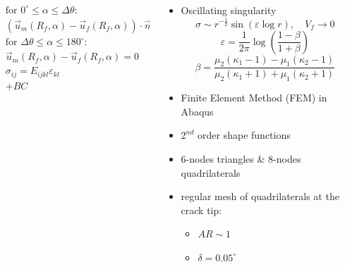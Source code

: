 \documentclass[first,firstsupp,lastsupp,last,hyperref,table]{ETHclass}
\begin{document}
\begin{frame}
\begin{columns}
\begin{column}{0.6\textwidth}
\begin{columns}
\begin{column}{0.7\columnwidth}
\begin{equation*}
\begin{aligned}
&\text{for } 0^{\circ}\leq\alpha\leq\Delta\theta:\\
&\left(\overrightarrow{u}_{m}\left(R_{f},\alpha\right)-\overrightarrow{u}_{f}\left(R_{f},\alpha\right)\right)\cdot\overrightarrow{n}_{\alpha}\geq 0\\
&\text{for } \Delta\theta\leq\alpha\leq 180^{\circ}:\\
&\overrightarrow{u}_{m}\left(R_{f},\alpha\right)-\overrightarrow{u}_{f}\left(R_{f},\alpha\right)=0\\
&\sigma_{ij}=E_{ijkl}\varepsilon_{kl}\\
&+BC
\end{aligned}
\end{equation*}
\end{column}
\end{columns}
\end{column}
\begin{column}{0.3\textwidth}
\scriptsize
\begin{itemize}[label=]
\item Oscillating singularity
\vspace{-0.25cm}
\begin{equation*}
\sigma\sim r^{-\frac{1}{2}}\sin\left(\varepsilon\log r\right),\quad V_{f}\rightarrow 0
\end{equation*}
\vspace{-0.25cm}
{\tiny
\begin{equation*}
\varepsilon=\frac{1}{2\pi}\log\left(\frac{1-\beta}{1+\beta}\right)
\end{equation*}
\vspace{-0.25cm}
\begin{equation*}
\beta=\frac{\mu_{2}\left(\kappa_{1}-1\right)-\mu_{1}\left(\kappa_{2}-1\right)}{\mu_{2}\left(\kappa_{1}+1\right)+\mu_{1}\left(\kappa_{2}+1\right)}
\end{equation*}}
\item Finite Element Method (FEM) in Abaqus\texttrademark
\item $2^{nd}$ order shape functions
\item 6-nodes triangles \& 8-nodes quadrilaterals
\item regular mesh of quadrilaterals at the crack tip:
\begin{itemize}[label=-]
\item $AR\sim 1$
\item $\delta=0.05^{\circ}$
\end{itemize}
\end{itemize}
\end{column}
\end{columns}
\end{frame}
\end{document}
